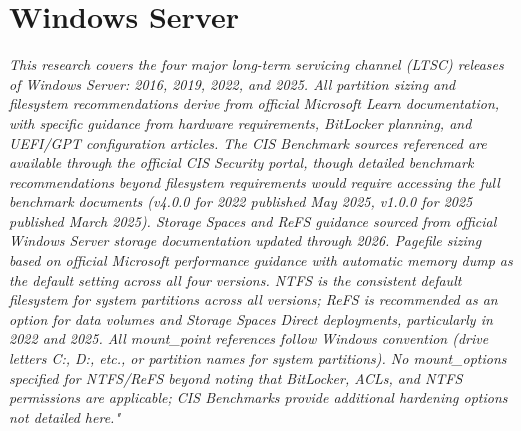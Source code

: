 \documentclass[10pt,a4paper]{article}
\begin{document}
\section{Windows Server}
\noindent\small\textit{This research covers the four major long-term servicing channel (LTSC) releases of Windows Server: 2016, 2019, 2022, and 2025. All partition sizing and filesystem recommendations derive from official Microsoft Learn documentation, with specific guidance from hardware requirements, BitLocker planning, and UEFI/GPT configuration articles. The CIS Benchmark sources referenced are available through the official CIS Security portal, though detailed benchmark recommendations beyond filesystem requirements would require accessing the full benchmark documents (v4.0.0 for 2022 published May 2025, v1.0.0 for 2025 published March 2025). Storage Spaces and ReFS guidance sourced from official Windows Server storage documentation updated through 2026. Pagefile sizing based on official Microsoft performance guidance with automatic memory dump as the default setting across all four versions. NTFS is the consistent default filesystem for system partitions across all versions; ReFS is recommended as an option for data volumes and Storage Spaces Direct deployments, particularly in 2022 and 2025. All mount\_point references follow Windows convention (drive letters C:, D:, etc., or partition names for system partitions). No mount\_options specified for NTFS/ReFS beyond noting that BitLocker, ACLs, and NTFS permissions are applicable; CIS Benchmarks provide additional hardening options not detailed here."
}\normalsize\par\medskip
\end{document}
